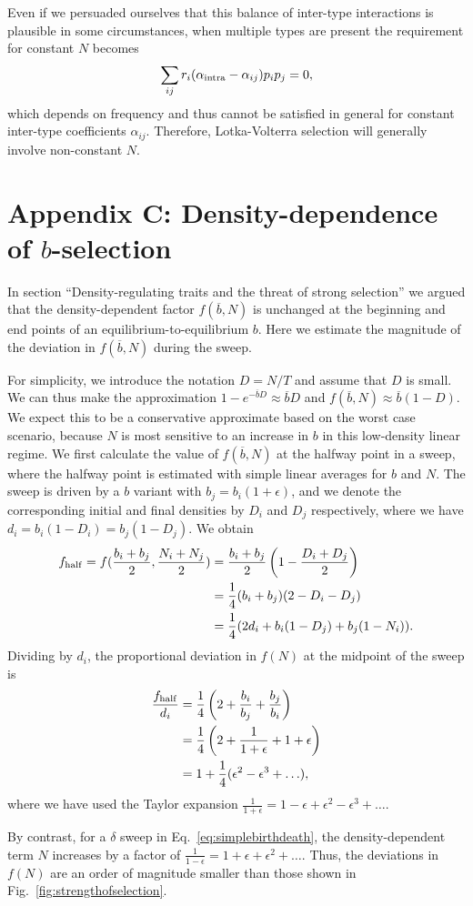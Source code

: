 \documentclass[12pt]{article}
\begin{document}
Even if we persuaded ourselves that this balance of inter-type interactions is plausible in some circumstances, when multiple types are present the requirement for constant $N$ becomes
\begin{equation}
\sum_{ij}r_i(\alpha_{\rm intra}-\alpha_{ij})p_ip_j=0,
\end{equation}
which depends on frequency and thus cannot be satisfied in general for constant inter-type coefficients $\alpha_{ij}$. Therefore, Lotka-Volterra selection will generally involve non-constant $N$.

\section*{Appendix C: Density-dependence of $b$-selection}

In section ``Density-regulating traits and the threat of strong selection'' we argued that the density-dependent factor $f(\overline{b},N)$ is unchanged at the beginning and end points of an equilibrium-to-equilibrium $b$. Here we estimate the magnitude of the deviation in $f(\overline{b},N)$ during the sweep. 

For simplicity, we introduce the notation $D=N/T$ and assume that $D$ is small. We can thus make the approximation $1-e^{-\overline{b}D}\approx \overline{b}D$ and $f(\overline{b},N)\approx \overline{b}(1-D)$. We expect this to be a conservative approximate based on the worst case scenario, because $N$ is most sensitive to an increase in $b$ in this low-density linear regime. We first calculate the value of $f(\overline{b},N)$ at the halfway point in a sweep, where the halfway point is estimated with simple linear averages for $b$ and $N$. The sweep is driven by a $b$ variant with $b_j=b_i(1+\epsilon)$, and we denote the corresponding initial and final densities by $D_i$ and $D_j$ respectively, where we have $d_i=b_i(1-D_i)=b_j(1-D_j)$. We obtain
\begin{align}
f_{\rm{half}}=f(\frac{b_i+b_j}{2},\frac{N_i+N_j}{2})&=\frac{b_i+b_j}{2}\left(1-\frac{D_i+D_j}{2}\right) \nonumber \\
&=\frac{1}{4} (b_i+b_j)(2-D_i-D_j) \nonumber \\
&=\frac{1}{4} (2d_i+b_i(1-D_j)+b_j(1-N_i)).
\end{align}
Dividing by $d_i$, the proportional deviation in $f(N)$ at the midpoint of the sweep is
\begin{align}
\frac{f_{\rm{half}}}{d_i}&=\frac{1}{4}\left(2+\frac{b_i}{b_j}+\frac{b_j}{b_i}\right)\nonumber \\
&=\frac{1}{4}\left(2+\frac{1}{1+\epsilon}+1+\epsilon\right)\nonumber \\
&=1+\frac{1}{4}(\epsilon^2-\epsilon^3+\ldots),
\end{align}
where we have used the Taylor expansion $\frac{1}{1+\epsilon}=1-\epsilon+\epsilon^2-\epsilon^3+\ldots$. 

By contrast, for a $\delta$ sweep in Eq.~\eqref{eq:simplebirthdeath}, the density-dependent term $N$ increases by a factor of $\frac{1}{1-\epsilon}=1+\epsilon+\epsilon^2+\ldots$. Thus,  the deviations in $f(N)$ are an order of magnitude smaller than those shown in Fig.~\eqref{fig:strengthofselection}.
\end{document}
